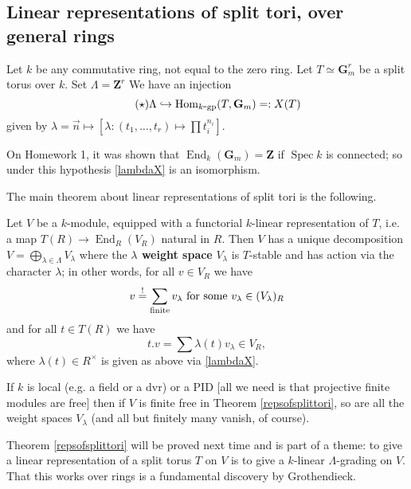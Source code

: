 \documentclass[10pt]{article}
\newcommand{\ZZ}{\mathbf{Z}}
\newcommand{\Hom}{\operatorname{Hom}}
\renewcommand{\(}{\left(}
\renewcommand{\)}{\right)}
\newcommand{\End}{\operatorname{End}}
\newcommand{\Spec}{\operatorname{Spec}}
\newcommand{\into}{\hookrightarrow}
\numberwithin{thm}{subsection}
\begin{document}
\subsection{Linear representations of split tori, over general rings}
Let $k$ be any commutative ring, not equal to the zero ring.
Let $T\simeq \mathbf{G}_m^r$ be a split torus over $k$.
Set $\Lambda=\ZZ^r$
We have an injection
\begin{equation*}\label{lambdaX}
\tag{$\star$}\Lambda\into \Hom_{k\mbox{-}{\rm{gp}}}(T,\mathbf{G}_m)=:X(T) 
\end{equation*}
given by $\lambda=\vec n\mapsto [\lambda:(t_1,\ldots, t_r)\mapsto \prod t_i^{n_i}]$.
\begin{rem}
On Homework 1, it was shown that $\End_k(\mathbf{G}_m)=\ZZ$ if $\Spec k$ is connected;
so under this hypothesis \eqref{lambdaX} is an isomorphism.
\end{rem}
The main theorem about linear representations of split tori is the following.
\begin{thm}\label{repsofsplittori}
Let $V$ be a $k$-module,
equipped with a functorial $k$-linear representation of $T$,
i.e. a map $T(R)\to \End_R(V_R)$ natural in $R$.
Then $V$ has a unique decomposition $V=\bigoplus_{\lambda\in \Lambda}V_\lambda$
where the \textbf{$\lambda$ weight space}
$V_\lambda$ is $T$-stable
and has action via the character $\lambda$;
in other words, for all $v \in V_R$ we have 
\[v\stackrel{!}{=}\sum_{\rm{finite}}v_\lambda\text{ for some }v_\lambda\in (V_\lambda)_R\]
and for all $t \in T(R)$ we have 
\[t.v=\sum \lambda(t)v_\lambda\in V_R,\]
where $\lambda(t)\in R^\times$ is given as above via \eqref{lambdaX}.
\end{thm}
\begin{rem}
If $k$ is local (e.g. a field or a dvr)
or a PID [all we need is that projective finite modules are free]
then if $V$ is finite free in Theorem \ref{repsofsplittori},
so are all the weight spaces $V_\lambda$ (and all but finitely many vanish, of course).
\end{rem}

Theorem \ref{repsofsplittori} will be proved next time and is part of a theme:
to give a linear representation of a split torus $T$ on $V$
is to give a $k$-linear $\Lambda$-grading on $V$.
That this works over rings is a fundamental discovery by Grothendieck. 
\end{document}
